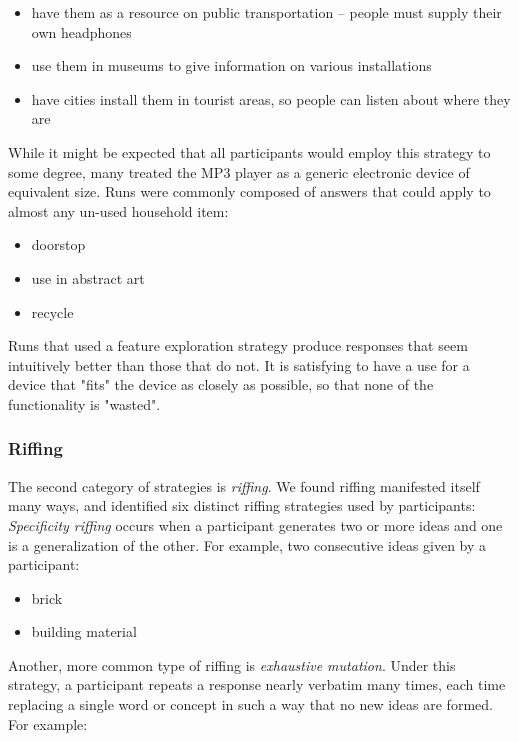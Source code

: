 \begin{itemize}
    \item have them as a resource on public transportation -- people must supply their own headphones
    \item use them in museums to give information on various installations
    \item have cities install them in tourist areas, so people can listen about where they are
\end{itemize}

While it might be expected that all participants would employ this strategy to some degree, many treated the MP3 player as a generic electronic device of equivalent size. Runs were commonly composed of answers that could apply to almost any un-used household item:

\begin{itemize}
    \item doorstop
    \item use in abstract art
    \item recycle
\end{itemize}

Runs that used a feature exploration strategy produce responses that seem intuitively better than those that do not. It is satisfying to have a use for a device that "fits" the device as closely as possible, so that none of the functionality is "wasted". 

\subsubsection{Riffing}

The second category of strategies is \emph{riffing}. We found riffing manifested itself many ways, and identified six distinct riffing strategies used by participants: \emph{Specificity riffing} occurs when a participant generates two or more ideas and one is a generalization of the other. For example, two consecutive ideas given by a participant:

\begin{itemize}
    \item brick
    \item building material
\end{itemize}

Another, more common type of riffing is \emph{exhaustive mutation}. Under this strategy, a participant repeats a response nearly verbatim many times, each time replacing a single word or concept in such a way that no new ideas are formed. For example:

